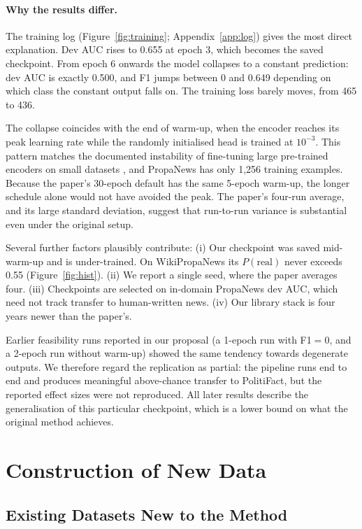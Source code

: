 \documentclass[11pt]{article}
\begin{document}
\paragraph{Why the results differ.} The training log (Figure~\ref{fig:training}; Appendix~\ref{app:log}) gives the most direct explanation. Dev AUC rises to 0.655 at epoch 3, which becomes the saved checkpoint. From epoch 6 onwards the model collapses to a constant prediction: dev AUC is exactly 0.500, and F1 jumps between 0 and 0.649 depending on which class the constant output falls on. The training loss barely moves, from 465 to 436.

The collapse coincides with the end of warm-up, when the encoder reaches its peak learning rate while the randomly initialised head is trained at $10^{-3}$. This pattern matches the documented instability of fine-tuning large pre-trained encoders on small datasets \citep{mosbach2021stability}, and PropaNews has only 1,256 training examples. Because the paper's 30-epoch default has the same 5-epoch warm-up, the longer schedule alone would not have avoided the peak. The paper's four-run average, and its large standard deviation, suggest that run-to-run variance is substantial even under the original setup.

Several further factors plausibly contribute:
(i) Our checkpoint was saved mid-warm-up and is under-trained. On WikiPropaNews its $P(\text{real})$ never exceeds 0.55 (Figure~\ref{fig:hist}).
(ii) We report a single seed, where the paper averages four.
(iii) Checkpoints are selected on in-domain PropaNews dev AUC, which need not track transfer to human-written news.
(iv) Our library stack is four years newer than the paper's.

Earlier feasibility runs reported in our proposal (a 1-epoch run with F1$=$0, and a 2-epoch run without warm-up) showed the same tendency towards degenerate outputs. We therefore regard the replication as partial: the pipeline runs end to end and produces meaningful above-chance transfer to PolitiFact, but the reported effect sizes were not reproduced. All later results describe the generalisation of this particular checkpoint, which is a lower bound on what the original method achieves.

\section{Construction of New Data}
\label{sec:newdata}

\subsection{Existing Datasets New to the Method}
\end{document}
